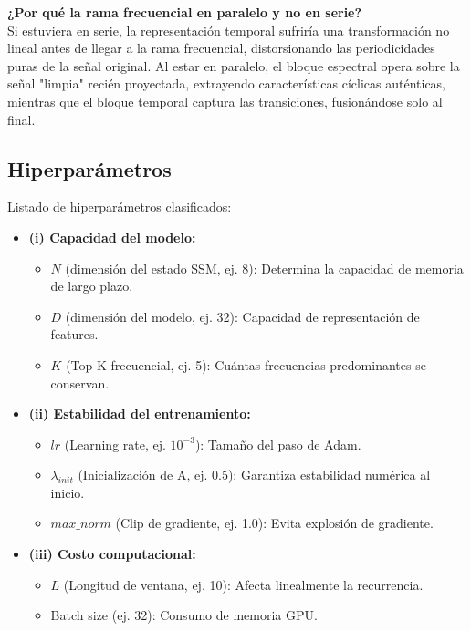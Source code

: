 \documentclass[12pt,a4paper]{article}
\begin{document}
\textbf{¿Por qué la rama frecuencial en paralelo y no en serie?}\\
Si estuviera en serie, la representación temporal sufriría una transformación no lineal antes de llegar a la rama frecuencial, distorsionando las periodicidades puras de la señal original. Al estar en paralelo, el bloque espectral opera sobre la señal "limpia" recién proyectada, extrayendo características cíclicas auténticas, mientras que el bloque temporal captura las transiciones, fusionándose solo al final.

\subsection{Hiperparámetros}

Listado de hiperparámetros clasificados:

\begin{itemize}
    \item \textbf{(i) Capacidad del modelo:}
    \begin{itemize}
        \item $N$ (dimensión del estado SSM, ej. 8): Determina la capacidad de memoria de largo plazo.
        \item $D$ (dimensión del modelo, ej. 32): Capacidad de representación de features.
        \item $K$ (Top-K frecuencial, ej. 5): Cuántas frecuencias predominantes se conservan.
    \end{itemize}
    \item \textbf{(ii) Estabilidad del entrenamiento:}
    \begin{itemize}
        \item $lr$ (Learning rate, ej. $10^{-3}$): Tamaño del paso de Adam.
        \item $\lambda_{init}$ (Inicialización de A, ej. 0.5): Garantiza estabilidad numérica al inicio.
        \item $max\_norm$ (Clip de gradiente, ej. 1.0): Evita explosión de gradiente.
    \end{itemize}
    \item \textbf{(iii) Costo computacional:}
    \begin{itemize}
        \item $L$ (Longitud de ventana, ej. 10): Afecta linealmente la recurrencia.
        \item Batch size (ej. 32): Consumo de memoria GPU.
    \end{itemize}
\end{itemize}
\end{document}
